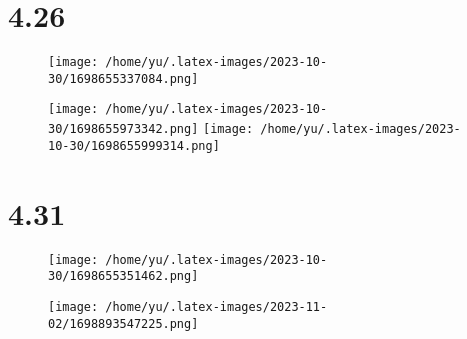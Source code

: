 \documentclass[14pt]{extarticle}
\begin{document}
\vspace*{0pt}
\section{4.26}

\begin{figure}[H]
    \centering
    \texttt{[image: /home/yu/.latex-images/2023-10-30/1698655337084.png]}
\end{figure}

\begin{figure}[H]
    \centering
    \texttt{[image: /home/yu/.latex-images/2023-10-30/1698655973342.png]}
    \texttt{[image: /home/yu/.latex-images/2023-10-30/1698655999314.png]}
\end{figure}


\section{4.31}
\begin{figure}[H]
    \centering
    \texttt{[image: /home/yu/.latex-images/2023-10-30/1698655351462.png]}
\end{figure}

\begin{figure}[H]
    \centering
    \texttt{[image: /home/yu/.latex-images/2023-11-02/1698893547225.png]}
\end{figure}

\inputminted{cpp}{4.31.cpp}
\end{document}
